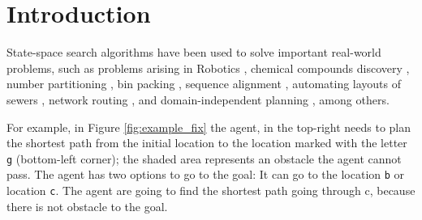 

\chapter{Introduction}\label{aboutTheProblem}
\setcounter{page}{1}
\noindent
State-space search algorithms have been used to solve important real-world problems, such as problems arising in Robotics \cite{DBLP:journals/corr/BadruddinA15}, chemical compounds discovery \cite{Heifets:2012:CNM:2900929.2900950}, number partitioning \cite{Korf:1998:CAA:297463.297468}, bin packing \cite{Korf:2002:NAO:777092.777205}, sequence alignment \cite{Korf:2000:DFS:647288.721444}, automating layouts of sewers \cite{Burch:2010:ALS:1860967.1861096}, network routing \cite{DBLP:conf/icc/LiHH05}, and domain-independent planning \cite{Bonet:2001:PHS:380331.380332}, among others.

\iffalse
For example, in Figure \ref{fig:example_fix} the agent, in the top-right needs to plan the shortest path from the initial location to the location marked with the letter \texttt{g} (bottom-left corner); the shaded area represents an obstacle the agent cannot pass. The agent has two options to go to the goal: It can go to the location \texttt{b} or location \texttt{c}. The agent are going to find the shortest path going through c, because there is not obstacle to the goal. 

